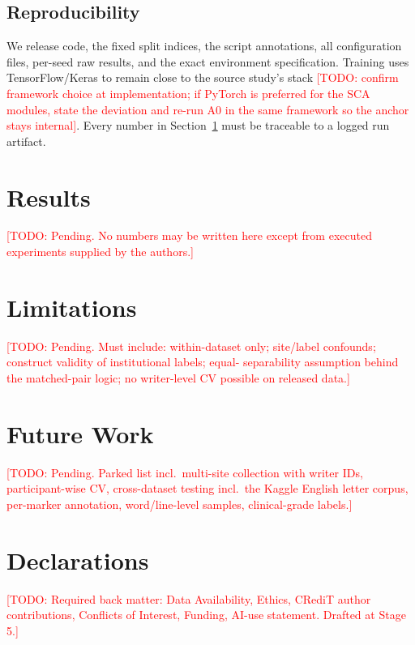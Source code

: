 \documentclass[11pt,a4paper]{article}
\newcommand{\todonote}[1]{\textcolor{red}{[TODO: #1]}}
\begin{document}
\subsection{Reproducibility}

We release code, the fixed split indices, the script annotations,
all configuration files, per-seed raw results, and the exact
environment specification. Training uses TensorFlow/Keras to remain
close to the source study's stack \todonote{confirm framework choice
at implementation; if PyTorch is preferred for the SCA modules,
state the deviation and re-run A0 in the same framework so the
anchor stays internal}. Every number in Section~\ref{sec:results}
must be traceable to a logged run artifact.

\section{Results}
\label{sec:results}
\todonote{Pending. No numbers may be written here except from
executed experiments supplied by the authors.}

\section{Limitations}
\label{sec:limitations}
\todonote{Pending. Must include: within-dataset only; site/label
confounds; construct validity of institutional labels; equal-
separability assumption behind the matched-pair logic; no
writer-level CV possible on released data.}

\section{Future Work}
\label{sec:future}
\todonote{Pending. Parked list incl.\ multi-site collection with
writer IDs, participant-wise CV, cross-dataset testing incl.\ the
Kaggle English letter corpus, per-marker annotation, word/line-level
samples, clinical-grade labels.}

\section*{Declarations}
\todonote{Required back matter: Data Availability, Ethics, CRediT
author contributions, Conflicts of Interest, Funding, AI-use
statement. Drafted at Stage 5.}
\end{document}
